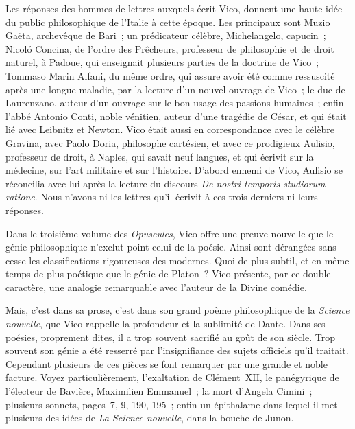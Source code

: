 \documentclass[french,twoside]{book} %
\begin{document}
Les réponses des hommes de lettres auxquels écrit Vico, donnent une haute idée du public philosophique de l’Italie à cette époque. Les principaux sont Muzio Gaëta, archevêque de Bari ; un prédicateur célèbre, Michelangelo, capucin ; Nicoló Concina, de l’ordre des Prêcheurs, professeur de philosophie et de droit naturel, à Padoue, qui enseignait plusieurs parties de la doctrine de Vico ; Tommaso Marin Alfani, du même ordre, qui assure avoir été comme ressuscité après une longue maladie, par la lecture d’un nouvel ouvrage de Vico ; le duc de Laurenzano, auteur d’un ouvrage sur le bon usage des passions humaines ; enfin l’abbé Antonio Conti, noble vénitien, auteur d’une tragédie de César, et qui était lié avec Leibnitz et Newton. Vico était aussi en correspondance avec le célèbre Gravina, avec Paolo  Doria, philosophe cartésien, et avec ce prodigieux Aulisio, professeur de droit, à Naples, qui savait neuf langues, et qui écrivit sur la médecine, sur l’art militaire et sur l’histoire. D’abord ennemi de Vico, Aulisio se réconcilia avec lui après la lecture du discours {\itshape De nostri temporis studiorum ratione}. Nous n’avons ni les lettres qu’il écrivit à ces trois derniers ni leurs réponses.\par
\par
Dans le troisième volume des {\itshape Opuscules}, Vico offre une preuve nouvelle que le génie philosophique n’exclut point celui de la poésie. Ainsi sont dérangées sans cesse les classifications rigoureuses des modernes. Quoi de plus subtil, et en même temps de plus poétique que le génie de Platon ? Vico présente, par ce double caractère, une analogie remarquable avec l’auteur de la Divine comédie.\par
Mais, c’est dans sa prose, c’est dans son grand poème philosophique de la {\itshape Science nouvelle}, que Vico rappelle la profondeur et la sublimité de Dante. Dans ses poésies, proprement dites, il a trop souvent sacrifié au goût de son siècle. Trop souvent son génie a été resserré par l’insignifiance des sujets officiels qu’il traitait. Cependant plusieurs de ces pièces se font remarquer par une grande et noble facture. Voyez particulièrement, l’exaltation de Clément XII, le panégyrique de l’électeur de Bavière, Maximilien Emmanuel ; la mort d’Angela Cimini ; plusieurs sonnets, pages 7, 9, 190, 195 ; enfin un épithalame dans lequel il met plusieurs des idées de {\itshape La Science nouvelle}, dans la bouche de Junon.\par
\end{document}
